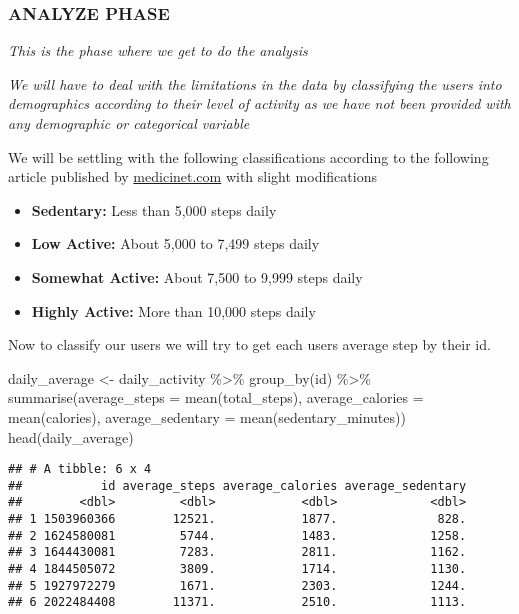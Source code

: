\documentclass[
]{article}
\newenvironment{Shaded}{\begin{snugshade}}{\end{snugshade}}
\newcommand{\AttributeTok}[1]{\textcolor[rgb]{0.77,0.63,0.00}{#1}}
\newcommand{\FunctionTok}[1]{\textcolor[rgb]{0.00,0.00,0.00}{#1}}
\newcommand{\NormalTok}[1]{#1}
\newcommand{\OtherTok}[1]{\textcolor[rgb]{0.56,0.35,0.01}{#1}}
\newcommand{\SpecialCharTok}[1]{\textcolor[rgb]{0.00,0.00,0.00}{#1}}
\providecommand{\tightlist}{%
  \setlength{\itemsep}{0pt}\setlength{\parskip}{0pt}}
\begin{document}
\hypertarget{analyze-phase}{%
\subsubsection{ANALYZE PHASE}\label{analyze-phase}}

\emph{This is the phase where we get to do the analysis}

\emph{We will have to deal with the limitations in the data by
classifying the users into demographics according to their level of
activity as we have not been provided with any demographic or
categorical variable}

We will be settling with the following classifications according to the
following article published by
\href{https://www.medicinenet.com/how_many_steps_a_day_is_considered_active/article.htm}{medicinet.com}
with slight modifications

\begin{itemize}
\tightlist
\item
  \textbf{Sedentary:} Less than 5,000 steps daily
\item
  \textbf{Low Active:} About 5,000 to 7,499 steps daily
\item
  \textbf{Somewhat Active:} About 7,500 to 9,999 steps daily
\item
  \textbf{Highly Active:} More than 10,000 steps daily
\end{itemize}

Now to classify our users we will try to get each users average step by
their id.

\begin{Shaded}
\begin{Highlighting}[]
\NormalTok{daily\_average }\OtherTok{\textless{}{-}}\NormalTok{ daily\_activity }\SpecialCharTok{\%\textgreater{}\%} 
  \FunctionTok{group\_by}\NormalTok{(id) }\SpecialCharTok{\%\textgreater{}\%} 
  \FunctionTok{summarise}\NormalTok{(}\AttributeTok{average\_steps =} \FunctionTok{mean}\NormalTok{(total\_steps), }\AttributeTok{average\_calories =} \FunctionTok{mean}\NormalTok{(calories), }\AttributeTok{average\_sedentary =} \FunctionTok{mean}\NormalTok{(sedentary\_minutes))}
\FunctionTok{head}\NormalTok{(daily\_average)}
\end{Highlighting}
\end{Shaded}

\begin{verbatim}
## # A tibble: 6 x 4
##           id average_steps average_calories average_sedentary
##        <dbl>         <dbl>            <dbl>             <dbl>
## 1 1503960366        12521.            1877.              828.
## 2 1624580081         5744.            1483.             1258.
## 3 1644430081         7283.            2811.             1162.
## 4 1844505072         3809.            1714.             1130.
## 5 1927972279         1671.            2303.             1244.
## 6 2022484408        11371.            2510.             1113.
\end{verbatim}
\end{document}
